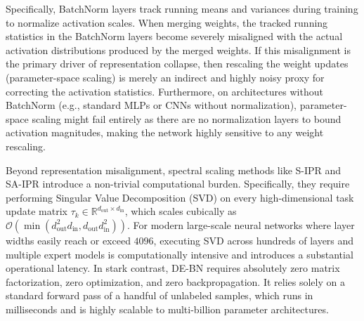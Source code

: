 \documentclass{article}
\begin{document}
Specifically, BatchNorm layers track running means and variances during training to normalize activation scales. When merging weights, the tracked running statistics in the BatchNorm layers become severely misaligned with the actual activation distributions produced by the merged weights. If this misalignment is the primary driver of representation collapse, then rescaling the weight updates (parameter-space scaling) is merely an indirect and highly noisy proxy for correcting the activation statistics. Furthermore, on architectures without BatchNorm (e.g., standard MLPs or CNNs without normalization), parameter-space scaling might fail entirely as there are no normalization layers to bound activation magnitudes, making the network highly sensitive to any weight rescaling.

Beyond representation misalignment, spectral scaling methods like S-IPR and SA-IPR introduce a non-trivial computational burden. Specifically, they require performing Singular Value Decomposition (SVD) on every high-dimensional task update matrix $\tau_k \in \mathbb{R}^{d_{\text{out}} \times d_{\text{in}}}$, which scales cubically as $\mathcal{O}(\min(d_{\text{out}}^2 d_{\text{in}}, d_{\text{out}} d_{\text{in}}^2))$. For modern large-scale neural networks where layer widths easily reach or exceed $4096$, executing SVD across hundreds of layers and multiple expert models is computationally intensive and introduces a substantial operational latency. In stark contrast, DE-BN requires absolutely zero matrix factorization, zero optimization, and zero backpropagation. It relies solely on a standard forward pass of a handful of unlabeled samples, which runs in milliseconds and is highly scalable to multi-billion parameter architectures.
\end{document}
